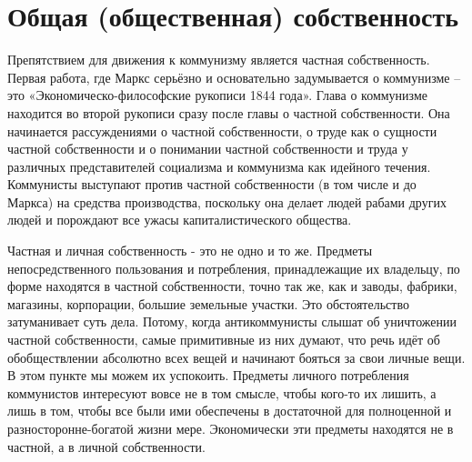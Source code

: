 \documentclass[../main]{subfiles}
\begin{document}
\ifSubfilesClassLoaded{\setcounter{page}{27}}{}
\section{Общая (общественная) собственность}
\label{sec:05_obshhaya_sobstvennost}

Препятствием для движения к коммунизму является частная собственность. Первая работа, где Маркс серьёзно и основательно задумывается о коммунизме – это «Экономическо-философские рукописи 1844 года». Глава о коммунизме находится во второй рукописи сразу после главы о частной собственности. Она начинается рассуждениями о частной собственности, о труде как о сущности частной собственности и о понимании частной собственности и труда у различных представителей социализма и коммунизма как идейного течения. Коммунисты выступают против частной собственности (в том числе и до Маркса) на средства производства, поскольку она делает людей рабами других людей и порождают все ужасы капиталистического общества.

Частная и личная собственность - это не одно и то же. Предметы непосредственного пользования и потребления, принадлежащие их владельцу, по форме находятся в частной собственности, точно так же, как и заводы, фабрики, магазины, корпорации, большие земельные участки. Это обстоятельство затуманивает суть дела. Потому, когда антикоммунисты слышат об уничтожении частной собственности, самые примитивные из них думают, что речь идёт об обобществлении абсолютно всех вещей и начинают бояться за свои личные вещи. В этом пункте мы можем их успокоить. Предметы личного потребления коммунистов интересуют вовсе не в том смысле, чтобы кого-то их лишить, а лишь в том, чтобы все были ими обеспечены в достаточной для полноценной и разносторонне-богатой жизни мере. Экономически эти предметы находятся не в частной, а в личной собственности.
\end{document}
